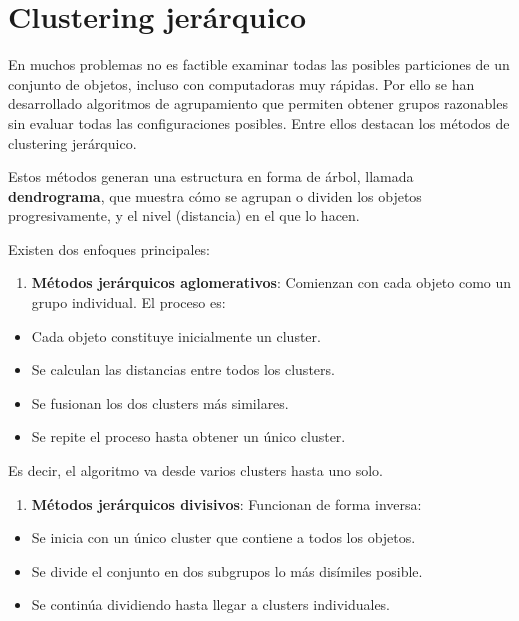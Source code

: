 \documentclass[
]{book}
\providecommand{\tightlist}{%
  \setlength{\itemsep}{0pt}\setlength{\parskip}{0pt}}
\begin{document}
\section{Clustering jerárquico}\label{clustering-jeruxe1rquico}

En muchos problemas no es factible examinar todas las posibles particiones de un conjunto de objetos, incluso con computadoras muy rápidas. Por ello se han desarrollado algoritmos de agrupamiento que permiten obtener grupos razonables sin evaluar todas las configuraciones posibles. Entre ellos destacan los métodos de clustering jerárquico.

Estos métodos generan una estructura en forma de árbol, llamada \textbf{dendrograma}, que muestra cómo se agrupan o dividen los objetos progresivamente, y el nivel (distancia) en el que lo hacen.

Existen dos enfoques principales:

\begin{enumerate}
\def\labelenumi{\arabic{enumi})}
\tightlist
\item
  \textbf{Métodos jerárquicos aglomerativos}: Comienzan con cada objeto como un grupo individual. El proceso es:
\end{enumerate}

\begin{itemize}
\tightlist
\item
  Cada objeto constituye inicialmente un cluster.
\item
  Se calculan las distancias entre todos los clusters.
\item
  Se fusionan los dos clusters más similares.
\item
  Se repite el proceso hasta obtener un único cluster.
\end{itemize}

Es decir, el algoritmo va desde varios clusters hasta uno solo.

\begin{enumerate}
\def\labelenumi{\arabic{enumi})}
\setcounter{enumi}{1}
\tightlist
\item
  \textbf{Métodos jerárquicos divisivos}: Funcionan de forma inversa:
\end{enumerate}

\begin{itemize}
\tightlist
\item
  Se inicia con un único cluster que contiene a todos los objetos.
\item
  Se divide el conjunto en dos subgrupos lo más disímiles posible.
\item
  Se continúa dividiendo hasta llegar a clusters individuales.
\end{itemize}
\end{document}
